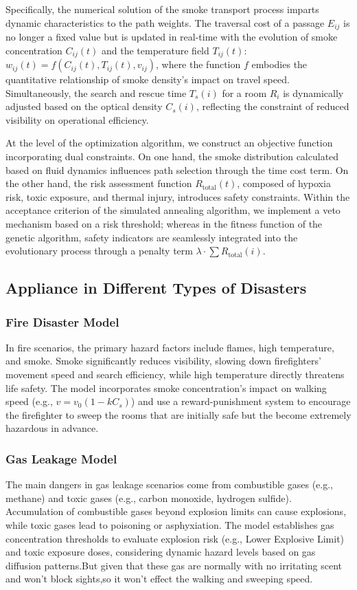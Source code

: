 Specifically, the numerical solution of the smoke transport process imparts dynamic characteristics to the path weights. The traversal cost of a passage \(E_{ij}\) is no longer a fixed value but is updated in real-time with the evolution of smoke concentration \(C_{ij}(t)\) and the temperature field \(T_{ij}(t)\): \(w_{ij}(t) = f(C_{ij}(t), T_{ij}(t), v_{ij})\), where the function \(f\) embodies the quantitative relationship of smoke density's impact on travel speed. Simultaneously, the search and rescue time \(T_s(i)\) for a room \(R_i\) is dynamically adjusted based on the optical density \(C_s(i)\), reflecting the constraint of reduced visibility on operational efficiency.

At the level of the optimization algorithm, we construct an objective function incorporating dual constraints. On one hand, the smoke distribution calculated based on fluid dynamics influences path selection through the time cost term. On the other hand, the risk assessment function \(R_{\text{total}}(t)\), composed of hypoxia risk, toxic exposure, and thermal injury, introduces safety constraints. Within the acceptance criterion of the simulated annealing algorithm, we implement a veto mechanism based on a risk threshold; whereas in the fitness function of the genetic algorithm, safety indicators are seamlessly integrated into the evolutionary process through a penalty term \(\lambda \cdot \sum R_{\text{total}}(i)\).

\subsection{Appliance in Different Types of Disasters}

\subsubsection{Fire Disaster Model}
In fire scenarios, the primary hazard factors include flames, high temperature, and smoke. Smoke significantly reduces visibility, slowing down firefighters' movement speed and search efficiency, while high temperature directly threatens life safety. The model incorporates smoke concentration's impact on walking speed (e.g., \(v = v_0(1 - k C_s)\)) and use a reward-punishment system to encourage the firefighter to sweep the rooms that are initially safe but the become extremely hazardous in advance.

\subsubsection{Gas Leakage Model}
The main dangers in gas leakage scenarios come from combustible gases (e.g., methane) and toxic gases (e.g., carbon monoxide, hydrogen sulfide). Accumulation of combustible gases beyond explosion limits can cause explosions, while toxic gases lead to poisoning or asphyxiation. The model establishes gas concentration thresholds to evaluate explosion risk (e.g., Lower Explosive Limit) and toxic exposure doses, considering dynamic hazard levels based on gas diffusion patterns.But given that these gas are normally with no irritating scent and won't block sights,so it won't effect the walking and  sweeping speed.

